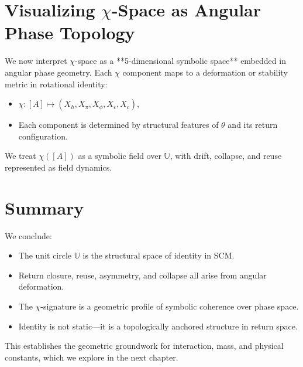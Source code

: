 \section{Visualizing $\chi$-Space as Angular Phase Topology}

We now interpret $\chi$-space as a **5-dimensional symbolic space** embedded in angular phase geometry. Each $\chi$ component maps to a deformation or stability metric in rotational identity:

\begin{itemize}
    \item $\chi: [A] \mapsto (X_h, X_\pi, X_\phi, X_\epsilon, X_c)$,
    \item Each component is determined by structural features of $\theta$ and its return configuration.
\end{itemize}

We treat $\chi([A])$ as a symbolic field over $\mathbb{U}$, with drift, collapse, and reuse represented as field dynamics.

\section{Summary}

We conclude:

\begin{itemize}
    \item The unit circle $\mathbb{U}$ is the structural space of identity in SCM.
    \item Return closure, reuse, asymmetry, and collapse all arise from angular deformation.
    \item The $\chi$-signature is a geometric profile of symbolic coherence over phase space.
    \item Identity is not static—it is a topologically anchored structure in return space.
\end{itemize}

This establishes the geometric groundwork for interaction, mass, and physical constants, which we explore in the next chapter.
